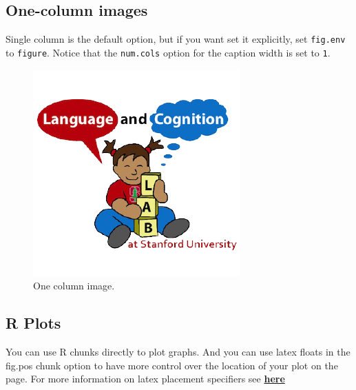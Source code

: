 \documentclass[10pt, letterpaper]{article}
\newenvironment{CodeChunk}{}{}
\begin{document}
\hypertarget{one-column-images}{%
\subsection{One-column images}\label{one-column-images}}

Single column is the default option, but if you want set it explicitly,
set \texttt{fig.env} to \texttt{figure}. Notice that the
\texttt{num.cols} option for the caption width is set to \texttt{1}.

\begin{CodeChunk}
\begin{figure}[H]

{\centering \includegraphics{figs/image-1} 

}

\caption[One column image]{One column image.}\label{fig:image}
\end{figure}
\end{CodeChunk}

\hypertarget{r-plots}{%
\subsection{R Plots}\label{r-plots}}

You can use R chunks directly to plot graphs. And you can use latex
floats in the fig.pos chunk option to have more control over the
location of your plot on the page. For more information on latex
placement specifiers see
\textbf{\href{https://en.wikibooks.org/wiki/LaTeX/Floats,_Figures_and_Captions}{here}}
\end{document}
